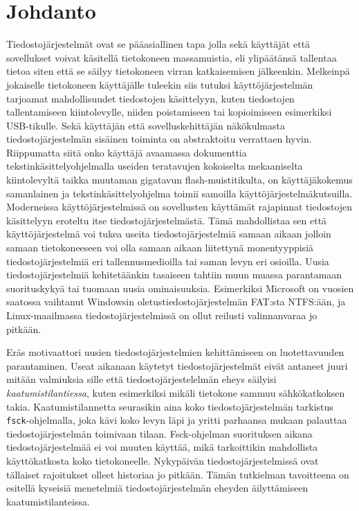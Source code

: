 \section{Johdanto}

Tiedostojärjestelmät ovat se pääasiallinen tapa jolla sekä käyttäjät että sovellukset voivat käsitellä tietokoneen massamuistia,
eli ylipäätänsä tallentaa tietoa siten että se säilyy tietokoneen virran katkaisemisen jälkeenkin.
Melkeinpä jokaiselle tietokoneen käyttäjälle tuleekin siis tutuksi käyttöjärjestelmän tarjoamat mahdollisuudet tiedostojen käsittelyyn,
kuten tiedostojen tallentamiseen kiintolevylle, niiden poistamiseen tai kopioimiseen esimerkiksi USB-tikulle.
Sekä käyttäjän että sovelluskehittäjän näkökulmasta tiedostojärjestelmän sisäinen toiminta on abstraktoitu verrattaen hyvin.
Riippumatta siitä onko käyttäjä avaamassa dokumenttia tekstinkäsittelyohjelmalla useiden teratavujen kokoiselta mekaaniselta kiintolevyltä taikka muutaman gigatavun flash-muistitikulta,
on käyttäjäkokemus samanlainen ja tekstinkäsittelyohjelma toimii samoilla käyttöjärjestelmäkutsuilla.
Moderneissa käyttöjärjestelmissä on sovellusten käyttämät rajapinnat tiedostojen käsittelyyn eroteltu itse tiedostojärjestelmästä.
Tämä mahdollistaa sen että käyttöjärjestelmä voi tukea useita tiedostojärjestelmiä samaan aikaan
jolloin samaan tietokoneeseen voi olla samaan aikaan liitettynä monentyyppisiä tiedostojärjestelmiä eri tallennusmedioilla tai saman levyn eri osioilla.
Uusia tiedostojärjestelmiä kehitetäänkin tasaiseen tahtiin muun muassa parantamaan suorituskykyä tai tuomaan uusia ominaisuuksia.
Esimerkiksi Microsoft on vuosien saatossa vaihtanut Windowsin oletustiedostojärjestelmän FAT:sta NTFS:ään,
ja Linux-maailmassa tiedostojärjestelmissä on ollut reilusti valinnanvaraa jo pitkään.

Eräs motivaattori uusien tiedostojärjestelmien kehittämiseen on luotettavuuden parantaminen.
Useat aikanaan käytetyt tiedostojärjestelmät eivät antaneet juuri mitään valmiuksia sille että tiedostojärjestelelmän eheys säilyisi \emph{kaatumistilantiessa},
kuten esimerkiksi mikäli tietokone sammuu sähkökatkoksen takia.
Kaatumistilannetta seurasikin aina koko tiedostojärjestelmän tarkistus \texttt{fsck}-ohjelmalla,
joka kävi koko levyn läpi ja yritti parhaansa mukaan palauttaa tiedostojärjestelmän toimivaan tilaan.
Fsck-ohjelman suorituksen aikana tiedostojärjestelmää ei voi muuten käyttää,
mikä tarkoittikin mahdollista käyttökatkosta koko tietokoneelle.
Nykypäivän tiedostojärjestelmissä ovat tällaiset rajoitukset olleet historiaa jo pitkään.
Tämän tutkielman tavoitteena on esitellä kyseisiä menetelmiä tiedostojärjestelmän eheyden äilyttämiseen kaatumistilanteissa.


